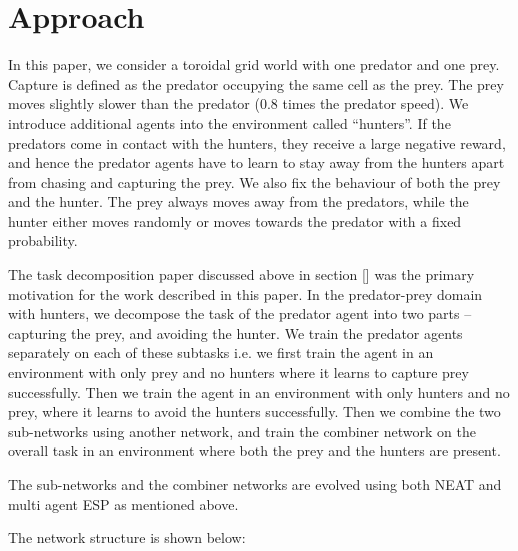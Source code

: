 \section{Approach}
In this paper, we consider a toroidal grid world with one predator and one prey. Capture is defined as the predator occupying the same cell as the prey. The prey moves slightly slower than the predator (0.8 times the predator speed). We introduce additional agents into the environment called “hunters”. If the predators come in contact with the hunters, they receive a large negative reward, and hence the predator agents have to learn to stay away from the hunters apart from chasing and capturing the prey. We also fix the behaviour of both the prey and the hunter. The prey always moves away from the predators, while the hunter either moves randomly or moves towards the predator with a fixed probability.

The task decomposition paper discussed above in section []  was the primary
motivation for the work described in this paper. In the predator-prey domain
with hunters, we decompose the task of the predator agent into two parts --
capturing the prey, and avoiding the hunter. We train the predator agents
separately on each of these subtasks i.e. we first train the agent in an environment with only prey and no hunters where it learns to capture prey successfully. Then we train the agent in an environment with only hunters and no prey, where it learns to avoid the hunters successfully. Then we combine the two sub-networks using another network, and train the combiner network on the overall task in an environment where both the prey and the hunters are present. 

The sub-networks and the combiner networks are evolved using both NEAT and multi agent ESP as mentioned above.

The network structure is shown below:
